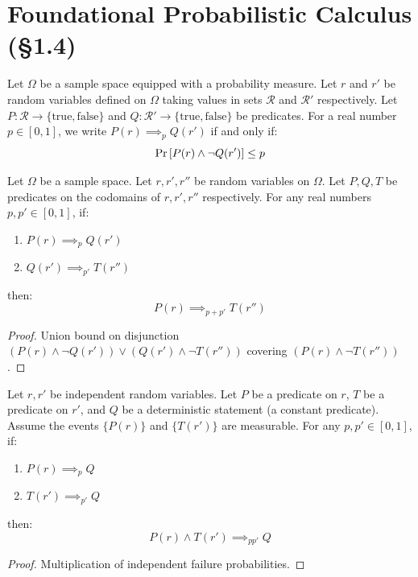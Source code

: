 \section*{Foundational Probabilistic Calculus (§1.4)}

\begin{definition}\label{def:probabilistic_implication}\leanok
Let $\Omega$ be a sample space equipped with a probability measure. Let $r$ and $r'$ be random variables defined on $\Omega$ taking values in sets $\mathcal{R}$ and $\mathcal{R}'$ respectively. Let $P: \mathcal{R} \to \{\text{true}, \text{false}\}$ and $Q: \mathcal{R}' \to \{\text{true}, \text{false}\}$ be predicates.
For a real number $p \in [0, 1]$, we write $P(r) \implies_p Q(r')$ if and only if:
\[ \Pr\left[ P(r) \land \neg Q(r') \right] \leq p \]
\end{definition}

\begin{lemma}[Chaining]\label{lem:chaining_probabilistic}\leanok {}
Let $\Omega$ be a sample space. Let $r, r', r''$ be random variables on $\Omega$. Let $P, Q, T$ be predicates on the codomains of $r, r', r''$ respectively.
For any real numbers $p, p' \in [0, 1]$, if:
\begin{enumerate}
    \item $P(r) \implies_p Q(r')$
    \item $Q(r') \implies_{p'} T(r'')$
\end{enumerate}
then:
\[ P(r) \implies_{p+p'} T(r'') \]
\end{lemma}
\begin{proof} \leanok
Union bound on disjunction $(P(r) \land \neg Q(r')) \lor (Q(r') \land \neg T(r''))$ covering $(P(r) \land \neg T(r''))$.
\end{proof}

\begin{lemma}[Conjunction]\label{lem:conjunction_probabilistic}\leanok {}
Let $r, r'$ be independent random variables. Let $P$ be a predicate on $r$, $T$ be a predicate on $r'$, and $Q$ be a deterministic statement (a constant predicate). Assume the events $\{P(r)\}$ and $\{T(r')\}$ are measurable.
For any $p, p' \in [0, 1]$, if:
\begin{enumerate}
    \item $P(r) \implies_p Q$
    \item $T(r') \implies_{p'} Q$
\end{enumerate}
then:
\[ P(r) \land T(r') \implies_{pp'} Q \]
\end{lemma}
\begin{proof} \leanok
Multiplication of independent failure probabilities.
\end{proof}

